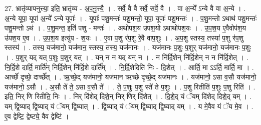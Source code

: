 \documentclass[17pt]{extarticle}
\begin{document}
27. भ्रातृ॑व्यापनुत्त्या॒ इति॒ भ्रातृ॑व्य - अ॒प॒नु॒त्त्यै॒ । . सर्वे॒ वै वै सर्वे॒ सर्वे॒ वै । . वा अ॒न्ये᳚ ऽन्ये वै वा अ॒न्ये । . अ॒न्ये यूपा॒ यूपा॑ अ॒न्ये᳚ ऽन्ये यूपाः᳚ । . यूपाः᳚ पशु॒मन्तः॑ पशु॒मन्तो॒ यूपा॒ यूपाः᳚ पशु॒मन्तः॑ । . प॒शु॒मन्तो ऽथाथ॑ पशु॒मन्तः॑ पशु॒मन्तो ऽथ॑ । . प॒शु॒मन्त॒ इति॑ पशु - मन्तः॑ । . अथो॑पश॒य उ॑पश॒यो ऽथाथो॑पश॒यः । . उ॒प॒श॒य ए॒वैवोप॑श॒य उ॑पश॒य ए॒व । . उ॒प॒श॒य इत्यु॑प - श॒यः । . ए॒वा प॒शु र॑प॒शु रे॒वै वाप॒शुः । . अ॒प॒शु स्तस्य॒ तस्या॑ प॒शु र॑प॒शु स्तस्य॑ । . तस्य॒ यज॑मानो॒ यज॑मान॒ स्तस्य॒ तस्य॒ यज॑मानः । . यज॑मानः प॒शुः प॒शुर् यज॑मानो॒ यज॑मानः प॒शुः । . प॒शुर् यद् यत् प॒शुः प॒शुर् यत् । . यन् न न यद् यन् न । . न नि॑र्दि॒शेन् नि॑र्दि॒शेन् न न नि॑र्दि॒शेत् । . नि॒र्दि॒शे दार्ति॒ मार्ति॑न् निर्दि॒शेन् नि॑र्दि॒शे दार्ति᳚म् । . नि॒र्दि॒शेदिति॑ निः - दि॒शेत् । . आर्ति॒ मा ऽऽर्ति॒ मार्ति॒ मा । . आर्च्छे॑ दृच्छे॒ दार्च्छे᳚त् । . ऋ॒च्छे॒द् यज॑मानो॒ यज॑मान ऋच्छे दृच्छे॒द् यज॑मानः । . यज॑मानो॒ ऽसा व॒सौ यज॑मानो॒ यज॑मानो॒ ऽसौ । . अ॒सौ ते॑ ते॒ ऽसा व॒सौ ते᳚ । . ते॒ प॒शुः प॒शु स्ते॑ ते प॒शुः । . प॒शु रितीति॑ प॒शुः प॒शु रिति॑ । . इति॒ निर् णि रितीति॒ निः । . निर् दि॑शेद् दिशे॒न् निर् णिर् दि॑शेत् । . दि॒शे॒द् यं ॅयम् दि॑शेद् दिशे॒द् यम् । . यम् द्वि॒ष्याद् द्वि॒ष्याद् यं ॅयम् द्वि॒ष्यात् । . द्वि॒ष्याद् यं ॅयम् द्वि॒ष्याद् द्वि॒ष्याद् यम् । . य मे॒वैव यं ॅय मे॒व । . ए॒व द्वेष्टि॒ द्वेष्ट्ये॒ वैव द्वेष्टि॑ । \newline
\end{document}
